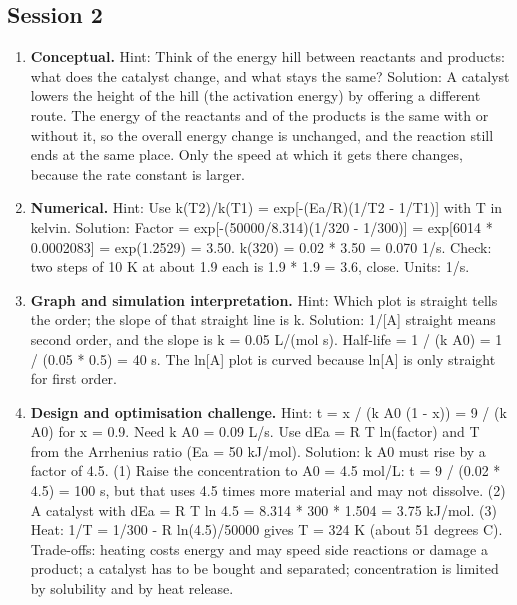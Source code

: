 \documentclass[11pt,a4paper]{article}
\begin{document}
\subsection*{Session 2}
\begin{enumerate}[nosep]
\item \textbf{Conceptual.} Hint: Think of the energy hill between reactants and products: what does the catalyst change, and what stays the same? Solution: A catalyst lowers the height of the hill (the activation energy) by offering a different route. The energy of the reactants and of the products is the same with or without it, so the overall energy change is unchanged, and the reaction still ends at the same place. Only the speed at which it gets there changes, because the rate constant is larger.
\item \textbf{Numerical.} Hint: Use k(T2)/k(T1) = exp[-(Ea/R)(1/T2 - 1/T1)] with T in kelvin. Solution: Factor = exp[-(50000/8.314)(1/320 - 1/300)] = exp[6014 * 0.0002083] = exp(1.2529) = 3.50. k(320) = 0.02 * 3.50 = 0.070 1/s. Check: two steps of 10 K at about 1.9 each is 1.9 * 1.9 = 3.6, close. Units: 1/s.
\item \textbf{Graph and simulation interpretation.} Hint: Which plot is straight tells the order; the slope of that straight line is k. Solution: 1/[A] straight means second order, and the slope is k = 0.05 L/(mol s). Half-life = 1 / (k A0) = 1 / (0.05 * 0.5) = 40 s. The ln[A] plot is curved because ln[A] is only straight for first order.
\item \textbf{Design and optimisation challenge.} Hint: t = x / (k A0 (1 - x)) = 9 / (k A0) for x = 0.9. Need k A0 = 0.09 L/s. Use dEa = R T ln(factor) and T from the Arrhenius ratio (Ea = 50 kJ/mol). Solution: k A0 must rise by a factor of 4.5. (1) Raise the concentration to A0 = 4.5 mol/L: t = 9 / (0.02 * 4.5) = 100 s, but that uses 4.5 times more material and may not dissolve. (2) A catalyst with dEa = R T ln 4.5 = 8.314 * 300 * 1.504 = 3.75 kJ/mol. (3) Heat: 1/T = 1/300 - R ln(4.5)/50000 gives T = 324 K (about 51 degrees C). Trade-offs: heating costs energy and may speed side reactions or damage a product; a catalyst has to be bought and separated; concentration is limited by solubility and by heat release.
\end{enumerate}
\end{document}
